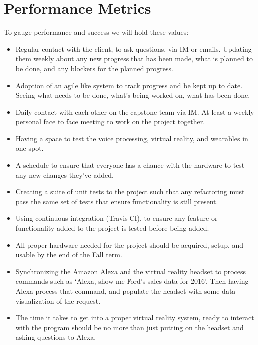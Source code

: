 \documentclass[onecolumn, draftclsnofoot,10pt, compsoc]{IEEEtran}
\begin{document}
\section{Performance Metrics}
To gauge performance and success we will hold these values:
\begin{itemize}

\item Regular contact with the client, to ask questions, via IM or emails. Updating them weekly about any new progress that has been made, what is planned to be done, and any blockers for the planned progress.

\item Adoption of an agile like system to track progress and be kept up to date. Seeing what needs to be done, what’s being worked on, what has been done.

\item Daily contact with each other on the capstone team via IM. At least a weekly personal face to face meeting to work on the project together.

\item Having a space to test the voice processing, virtual reality, and wearables in one spot.

\item A schedule to ensure that everyone has a chance with the hardware to test any new changes they’ve added.

\item Creating a suite of unit tests to the project such that any refactoring must pass the same set of tests that ensure functionality is still present.

\item Using continuous integration (Travis CI), to ensure any feature or functionality added to the project is tested before being added.

\item All proper hardware needed for the project should be acquired, setup, and usable by the end of the Fall term.

\item Synchronizing the Amazon Alexa and the virtual reality headset to process commands such as ‘Alexa, show me Ford’s sales data for 2016’. Then having Alexa process that command, and populate the headset with some data visualization of the request.

\item The time it takes to get into a proper virtual reality system, ready to interact with the program should be no more than just putting on the headset and asking questions to Alexa.


\end{itemize}
\end{document}
